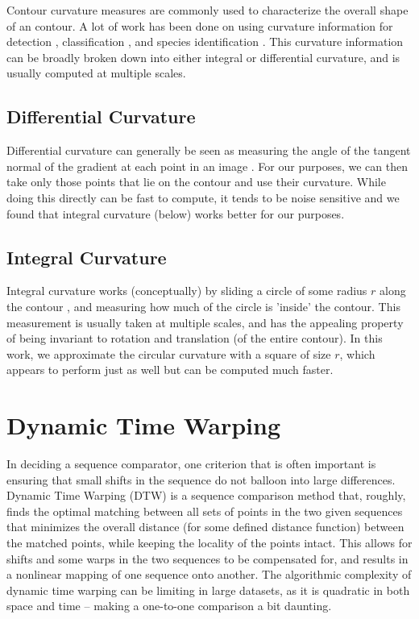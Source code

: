 Contour curvature measures are commonly used to characterize the overall shape of an contour. 
A lot of work has been done on using curvature information for detection \cite{monroy2011beyond}, classification \cite{fischer2014image}, and species identification \cite{kumar2012leafsnap}. %
This curvature information can be broadly broken down into either integral or differential curvature, and is usually computed at multiple scales.

\subsection{Differential Curvature}

Differential curvature can generally be seen as measuring the angle of the tangent normal of the gradient at each point in an image \cite{fischer2014image}.
For our purposes, we can then take only those points that lie on the contour and use their curvature.
While doing this directly can be fast to compute, it tends to be noise sensitive and we found that integral curvature (below) works better for our purposes.

\subsection{Integral Curvature}

Integral curvature works (conceptually) by sliding a circle of some radius $r$ along the contour \cite{pottmann2007integral}, and measuring how much of the circle is 'inside' the contour.
This measurement is usually taken at multiple scales, and has the appealing property of being invariant to rotation and translation (of the entire contour).
In this work, we approximate the circular curvature with a square of size $r$, which appears to perform just as well but can be computed much faster.

\section{Dynamic Time Warping}

In deciding a sequence comparator, one criterion that is often important is ensuring that small shifts in the sequence do not balloon into large differences.
Dynamic Time Warping (DTW) is a sequence comparison method that, roughly, finds the optimal matching between all sets of points in the two given sequences that minimizes the overall distance (for some defined distance function) between the matched points, while keeping the locality of the points intact.
This allows for shifts and some warps in the two sequences to be compensated for, and results in a nonlinear mapping of one sequence onto another.
The algorithmic complexity of dynamic time warping can be limiting in large datasets, as it is quadratic in both space and time -- making a one-to-one comparison a bit daunting.

